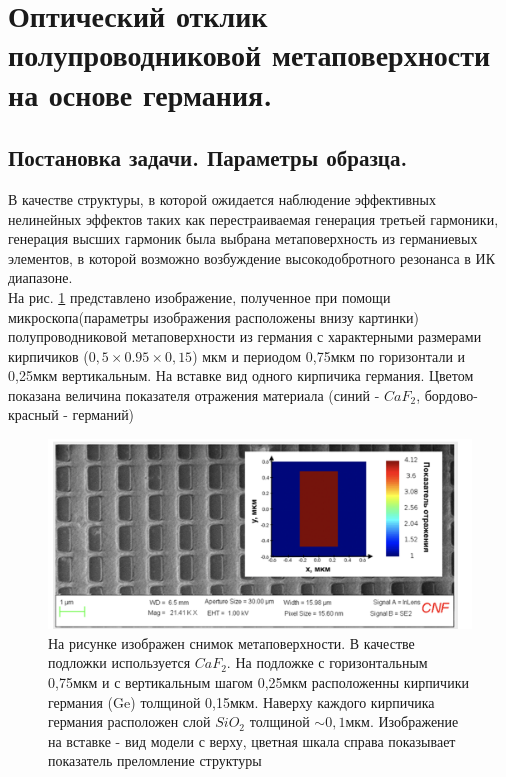 \section{Оптический отклик полупроводниковой метаповерхности на основе германия.}

\subsection{Постановка задачи. Параметры образца.}
В качестве структуры, в которой ожидается наблюдение эффективных нелинейных эффектов таких как перестраиваемая генерация третьей  гармоники, генерация высших гармоник была выбрана метаповерхность из германиевых элементов, в которой возможно возбуждение высокодобротного резонанса в ИК диапазоне. 
\\
На рис. \ref{base1} представлено изображение, полученное при помощи микроскопа(параметры изображения расположены внизу картинки) полупроводниковой метаповерхности из германия с характерными размерами кирпичиков ($0,5\times0.95\times0,15$) мкм и периодом 0,75мкм по горизонтали и  0,25мкм вертикальным. На вставке вид одного кирпичика германия. Цветом показана величина показателя отражения материала (синий - $CaF_2$, бордово-красный - германий)

\begin{figure}[h]
	\centering
    \includegraphics[width=0.8\linewidth]{images/base1.png}
	\caption{На рисунке изображен снимок метаповерхности. В качестве подложки используется $CaF_2$. На подложке с горизонтальным  0,75мкм и с вертикальным шагом 0,25мкм расположенны кирпичики германия (Ge) толщиной 0,15мкм. Наверху каждого кирпичика германия расположен слой  $SiO_2$ толщиной $\sim 0,1$мкм. Изображение на вставке - вид модели с верху, цветная шкала справа показывает показатель преломление структуры}
	\label{base1}
\end{figure}

